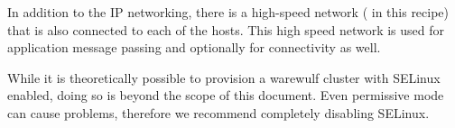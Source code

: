  In addition to the IP networking, there is a high-speed network
(\InfiniBand{} in this recipe) that is also connected to each of the
hosts. This high speed network is used for application message passing and
optionally for \Lustre{} connectivity as well.

\begin{center}
\begin{tcolorbox}[]
\small
While it is theoretically possible to provision a warewulf cluster with SELinux
enabled, doing so is beyond the scope of this document. Even permissive mode can
cause problems, therefore we recommend completely disabling SELinux.

\end{tcolorbox}
\end{center}
